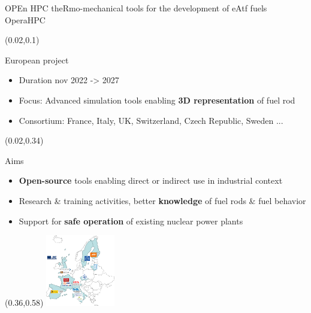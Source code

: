 \documentclass{beamer}
\begin{document}
\begin{frame}{{\small OPEn HPC theRmo-mechanical tools for the development of eAtf fuels}\\\hspace*{1cm}OperaHPC}
\begin{textblock}{.94}(0.02,0.1)
  \begin{block}{European project}
    \small
    \begin{itemize}
      \itemsep 0pt
      \parskip 0pt
      \item Duration nov 2022 -> 2027
      \item Focus: Advanced simulation tools enabling \textbf{3D representation} of fuel rod
      \item Consortium: France, Italy, UK, Switzerland, Czech Republic, Sweden ...
    \end{itemize}
  \end{block}
\end{textblock}
\begin{textblock}{.94}(0.02,0.34)
  \begin{block}{Aims}
    \small
    \begin{itemize}
      \itemsep 0pt
      \parskip 0pt
    \item \textbf{Open-source} tools enabling direct or indirect use in industrial context
    \item Research \& training activities, better \textbf{knowledge} of fuel rods \& fuel behavior
    \item Support for \textbf{safe operation} of existing nuclear power plants
    \end{itemize}
  \end{block}
\end{textblock}
\begin{textblock}{.7}(0.36,0.58)
\includegraphics[trim = .1cm .25cm .02cm .2cm,clip,width=3cm]{img/members_operahpc.png}\\[-2mm]
\hspace*{7mm}
\end{textblock}


\end{frame}
\end{document}
